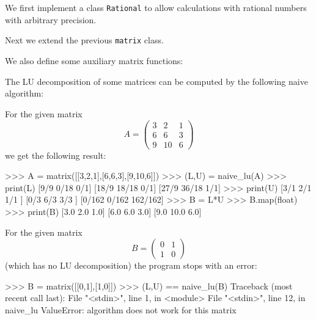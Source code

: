 \section{}
\label{section: LU decomposition}

We first implement a class \texttt{Rational} to allow calculations with rational numbers with arbitrary precision.



Next we extend the previous \texttt{matrix} class.



We also define some auxiliary matrix functions:



The LU decomposition of some matrices can be computed by the following naive algorithm:



For the given matrix
\[
    A
    = \begin{pmatrix}
        3 &  2 & 1  \\
        6 &  6 & 3  \\
        9 & 10 & 6
      \end{pmatrix}
\]
we get the following result:
\begin{consoleoutput}
>>> A = matrix([[3,2,1],[6,6,3],[9,10,6]])
>>> (L,U) = naive_lu(A)
>>> print(L)
[9/9  0/18  0/1]
[18/9 18/18 0/1]
[27/9 36/18 1/1]
>>> print(U)
[3/1   2/1   1/1    ]
[0/3   6/3   3/3    ]
[0/162 0/162 162/162]
>>> B = L*U
>>> B.map(float)
>>> print(B)
[3.0 2.0  1.0]
[6.0 6.0  3.0]
[9.0 10.0 6.0]
\end{consoleoutput}
For the given matrix
\[
    B
    = \begin{pmatrix}
        0 & 1 \\
        1 & 0
      \end{pmatrix}
\]
(which has no LU decomposition) the program stops with an error:
\begin{consoleoutput}
>>> B = matrix([[0,1],[1,0]])
>>> (L,U) == naive_lu(B)
Traceback (most recent call last):
  File "<stdin>", line 1, in <module>
  File "<stdin>", line 12, in naive_lu
ValueError: algorithm does not work for this matrix
\end{consoleoutput}
